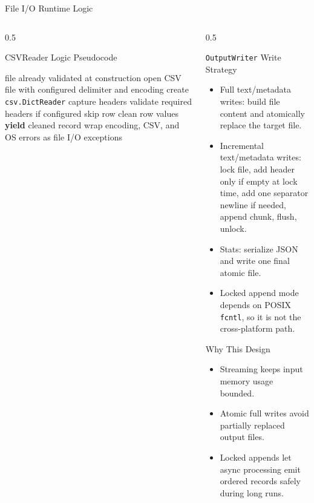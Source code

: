 \documentclass[
        11pt,
        compress,
        xcolor={dvipsnames}
    ]{beamer}
\begin{document}
\begin{frame}[shrink=5]{File I/O Runtime Logic}
  \begin{columns}[T]
    \begin{column}{0.5\textwidth}
      \begin{block}{CSVReader Logic Pseudocode}
        \scriptsize
        \begin{algorithmic}
            \State file already validated at construction
            \State open CSV file with configured delimiter and encoding
            \State create \texttt{csv.DictReader}
            \State capture headers
            \State validate required headers if configured
                \State skip row
              \Else
                \State clean row values
                \State \textbf{yield} cleaned record
              \EndIf
            \EndFor
            \State wrap encoding, CSV, and OS errors as file I/O exceptions
          \EndProcedure
        \end{algorithmic}
      \end{block}
    \end{column}
    \begin{column}{0.5\textwidth}
      \begin{block}{\texttt{OutputWriter} Write Strategy}
        \scriptsize
        \begin{itemize}\setlength{\itemsep}{0.25em}
          \item Full text/metadata writes: build file content and atomically replace the target file.
          \item Incremental text/metadata writes: lock file, add header only if empty at lock time, add one separator newline if needed, append chunk, flush, unlock.
          \item Stats: serialize JSON and write one final atomic file.
          \item Locked append mode depends on POSIX \texttt{fcntl}, so it is not the cross-platform path.
        \end{itemize}
      \end{block}
      \begin{block}{Why This Design}
        \scriptsize
        \begin{itemize}\setlength{\itemsep}{0.25em}
          \item Streaming keeps input memory usage bounded.
          \item Atomic full writes avoid partially replaced output files.
          \item Locked appends let async processing emit ordered records safely during long runs.
        \end{itemize}
      \end{block}
    \end{column}
  \end{columns}
\end{frame}
\end{document}
